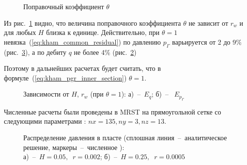 \documentclass{article}
\begin{document}
\begin{figure}[!ht]
  \centering
  
  \caption{Поправочный коэффициент $\theta$}
  \label{fig:kham_hw_inner_theta_map}
\end{figure}

Из рис.~\ref{fig:kham_hw_inner_theta_map} видно, что величина поправочного коэффициента $\theta$ не зависит от $r_w$ и для любых $H$ близка к единице.
Действительно, при $\theta=1$ невязка~(\ref{eq:kham_common_residual}) по давлению $p_{\Gamma}$ варьируется от 2 до 9\% (рис.~\ref{fig:kham_hw_inner_epg_map}), а по дебиту $q$ не более 4\% (рис.~\ref{fig:kham_hw_inner_eq_map})

Поэтому в дальнейших расчетах будет считать, что в формуле~(\ref{eq:kham_pgr_inner_section}) $\theta=1$.

\begin{figure}[!ht]
  \centering
  \begin{subfigure}{0.48\textwidth}
    \centering
    
    \caption{}
    \label{fig:kham_hw_inner_eq_map}
  \end{subfigure}
  \hfill
  \begin{subfigure}{0.48\textwidth}
    \centering
    
    \caption{}
    \label{fig:kham_hw_inner_epg_map}
  \end{subfigure}
  \caption{
    Зависимости от $H$, $r_w$ (при $\theta=1$):
  а)~--~$E_q$;
б)~--~ $E_{p_{\Gamma}}$
}
\label{fig:kham_hw_inner_theta_epg_maps}
\end{figure}

Численные расчеты были проведены в MRST на прямоугольной сетке со следующими параметрами : $nx=  135, ny = 3, nz = 13$.

\begin{figure}[!ht]
\centering
\begin{subfigure}{0.48\textwidth}
\centering

\caption{}
\label{fig:kham_hw_inner_p_worst_pg}
\end{subfigure}
\hfill
\begin{subfigure}{0.48\textwidth}
\centering

\caption{}
\label{fig:kham_hw_inner_p_best_pg}
\end{subfigure}
\caption{
Распределение давления в пласте (сплошная линия~--~аналитическое решение, маркеры~--~численное ): \\
а)~--~$H = 0.05, \;\; r = 0.002$;
б)~--~$H = 0.25, \;\; r = 0.0005$
}
\label{fig:kham_hw_inner_press_disrt}
\end{figure}
\end{document}
